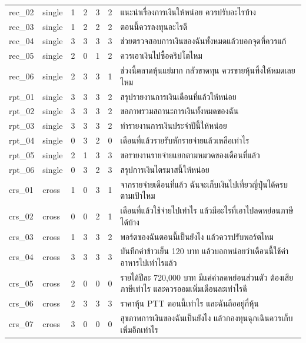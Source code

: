 \documentclass[11pt,a4paper]{article}
\begin{document}
{\begin{longtable}{llrrrrp{7.2cm}}
rec\_\allowbreak{}02 & single & 1 & 2 & 3 & 2 & {\thaifont แนะนำเรื่องการเงินให้หน่อย ควรปรับอะไรบ้าง} \\
rec\_\allowbreak{}03 & single & 1 & 2 & 2 & 2 & {\thaifont ตอนนี้ควรลงทุนอะไรดี} \\
rec\_\allowbreak{}04 & single & 3 & 3 & 3 & 3 & {\thaifont ช่วยตรวจสอบการเงินของฉันทั้งหมดแล้วบอกจุดที่ควรแก้} \\
rec\_\allowbreak{}05 & single & 2 & 0 & 1 & 2 & {\thaifont ควรเอาเงินไปซื้อคริปโตไหม} \\
rec\_\allowbreak{}06 & single & 2 & 3 & 3 & 1 & {\thaifont ช่วงนี้ตลาดหุ้นแย่มาก กลัวขาดทุน ควรขายหุ้นทิ้งให้หมดเลยไหม} \\
rpt\_\allowbreak{}01 & single & 3 & 3 & 3 & 2 & {\thaifont สรุปรายงานการเงินเดือนที่แล้วให้หน่อย} \\
rpt\_\allowbreak{}02 & single & 3 & 3 & 3 & 2 & {\thaifont ขอภาพรวมสถานะการเงินทั้งหมดของฉัน} \\
rpt\_\allowbreak{}03 & single & 3 & 3 & 3 & 2 & {\thaifont ทำรายงานการเงินประจำปีนี้ให้หน่อย} \\
rpt\_\allowbreak{}04 & single & 0 & 3 & 2 & 0 & {\thaifont เดือนที่แล้วรายรับหักรายจ่ายแล้วเหลือเท่าไร} \\
rpt\_\allowbreak{}05 & single & 2 & 1 & 3 & 3 & {\thaifont ขอรายงานรายจ่ายแยกตามหมวดของเดือนที่แล้ว} \\
rpt\_\allowbreak{}06 & single & 0 & 3 & 2 & 3 & {\thaifont สรุปการเงินไตรมาสนี้ให้หน่อย} \\
crs\_\allowbreak{}01 & cross & 1 & 0 & 3 & 1 & {\thaifont จากรายจ่ายเดือนที่แล้ว ฉันจะเก็บเงินไปเที่ยวญี่ปุ่นได้ครบตามเป้าไหม} \\
crs\_\allowbreak{}02 & cross & 0 & 0 & 2 & 1 & {\thaifont เดือนที่แล้วใช้จ่ายไปเท่าไร แล้วมีอะไรที่เอาไปลดหย่อนภาษีได้บ้าง} \\
crs\_\allowbreak{}03 & cross & 1 & 3 & 3 & 2 & {\thaifont พอร์ตของฉันตอนนี้เป็นยังไง แล้วควรปรับพอร์ตไหม} \\
crs\_\allowbreak{}04 & cross & 3 & 3 & 3 & 3 & {\thaifont บันทึกค่าข้าวเย็น }120 {\thaifont บาท แล้วบอกหน่อยว่าเดือนนี้ใช้ค่าอาหารไปเท่าไรแล้ว} \\
crs\_\allowbreak{}05 & cross & 2 & 0 & 0 & 0 & {\thaifont รายได้ปีละ }720,000 {\thaifont บาท มีแค่ค่าลดหย่อนส่วนตัว ต้องเสียภาษีเท่าไร และควรออมเพิ่มเดือนละเท่าไรดี} \\
crs\_\allowbreak{}06 & cross & 2 & 3 & 3 & 3 & {\thaifont ราคาหุ้น }PTT {\thaifont ตอนนี้เท่าไร และฉันถืออยู่กี่หุ้น} \\
crs\_\allowbreak{}07 & cross & 3 & 0 & 0 & 0 & {\thaifont สุขภาพการเงินของฉันเป็นยังไง แล้วกองทุนฉุกเฉินควรเก็บเพิ่มอีกเท่าไร} \\

\end{longtable}}
\end{document}
